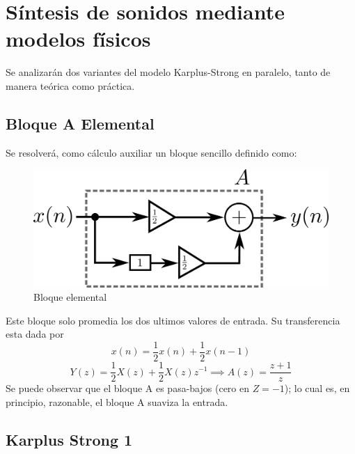 \documentclass[assd_tp2_main.tex]{subfiles}
\begin{document}
\section{Síntesis de sonidos mediante modelos f\'isicos}
Se analizarán dos variantes del modelo Karplus-Strong en paralelo, tanto de manera teórica como práctica. 

\subsection{Bloque A Elemental}
Se resolverá, como cálculo auxiliar un bloque sencillo definido como:
\begin{figure}[H]	
	\centering
	\includegraphics[scale=1]{graficos/bloque1ej5.png}
	\caption{Bloque elemental}
	\label{fig:bloqueElemental}
\end{figure}

Este bloque solo promedia los dos ultimos valores de entrada. Su transferencia esta dada por
\begin{equation}
x(n)=\frac{1}{2}x(n)+\frac{1}{2}x(n-1)
\end{equation}
\begin{equation}
Y(z)=\frac{1}{2}X(z)+\frac{1}{2}X(z)z^{-1} \implies A(z)=\frac{z+1}{z}
\end{equation}
Se puede observar que el bloque A es pasa-bajos (cero en $Z=-1$); lo cual es, en principio, razonable, el bloque A suaviza la entrada.

\subsection{Karplus Strong 1}
\end{document}

